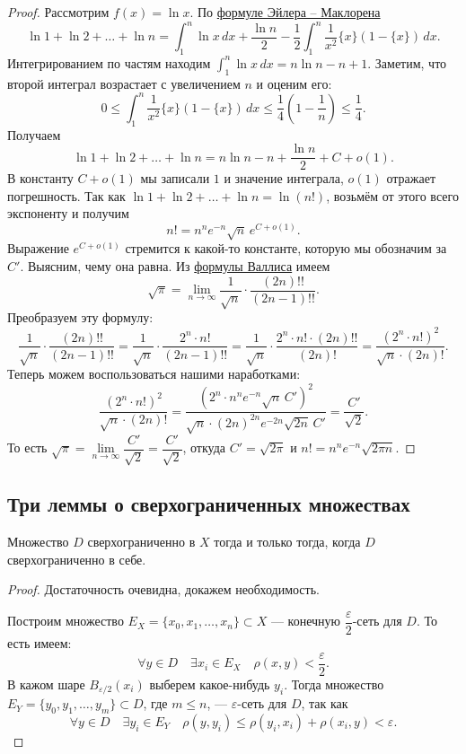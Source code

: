 \begin{proof}
	Рассмотрим \(f(x) = \ln x\). По \hyperlink{eumak}{формуле Эйлера -- Маклорена} \[
	\ln 1 + \ln 2 + \ldots + \ln n = \int_1^n \ln x \, dx + \frac{\ln n}{2} - \frac{1}{2} \int_1^n \frac{1}{x^2} \{x\} (1 - \{x\}) \, dx.
	\]
	Интегрированием по частям находим \(\displaystyle\int_1^n \ln x \, dx = n \ln n - n + 1\). Заметим, что второй интеграл возрастает с увеличением \(n\) и оценим его: \[
	0 \leqslant \int_1^n \frac{1}{x^2} \{x\} (1 - \{x\}) \, dx \leqslant \frac{1}{4} \left(1 - \frac{1}{n} \right) \leqslant \frac{1}{4}.
	\]
	Получаем \[
	\ln 1 + \ln 2 + \ldots + \ln n = n \ln n - n + \frac{\ln n}{2} + C + o(1).
	\]
	В константу \(C + o(1)\) мы записали \(1\) и значение интеграла, \(o(1)\) отражает погрешность. Так как \(\ln 1 + \ln 2 + \ldots + \ln n = \ln(n!)\), возьмём от этого всего экспоненту и получим \[
	n! = n^n e^{-n} \sqrt{n} \, e^{C + o(1)}.
	\]
	Выражение \(e^{C + o(1)}\) стремится к какой-то константе, которую мы обозначим за \(C'\). Выясним, чему она равна. Из \hyperlink{wall}{формулы Валлиса} имеем \[
	\sqrt{\pi} = \lim_{n \to \infty} \frac{1}{\sqrt{n}} \cdot \frac{(2n)!!}{(2n - 1)!!}.
	\]
	Преобразуем эту формулу: \[
	\frac{1}{\sqrt{n}} \cdot \frac{(2n)!!}{(2n - 1)!!} = \frac{1}{\sqrt{n}} \cdot \frac{2^n \cdot n!}{(2n - 1)!!} = \frac{1}{\sqrt{n}} \cdot \frac{2^n \cdot n! \cdot (2n)!!}{(2n)!} = \frac{(2^n \cdot n!)^2}{\sqrt{n} \cdot (2n)!}.
	\]
	Теперь можем воспользоваться нашими наработками: \[
	\frac{(2^n \cdot n!)^2}{\sqrt{n} \cdot (2n)!} = \frac{(2^n \cdot n^n e^{-n} \sqrt{n} \, C')^2}{\sqrt{n} \cdot (2n)^{2n} e^{-2n} \sqrt{2n} \, C'} = \frac{C'}{\sqrt{2}}.
	\]
	То есть \(\sqrt{\pi} = \lim\limits_{n \to \infty} \dfrac{C'}{\sqrt{2}} = \dfrac{C'}{\sqrt{2}}\), откуда \(C' = \sqrt{2\pi}\) и \(n! = n^n e^{-n} \sqrt{2\pi n}.\) 
	
\end{proof}

\subsection{Три леммы о сверхограниченных множествах}

\begin{lemma}
	Множество \(D\) сверхограниченно в \(X\) тогда и только тогда, когда \(D\) сверхограниченно в себе.
\end{lemma}

\begin{proof}
	Достаточность очевидна, докажем необходимость.
	
	Построим множество \(E_X = \{x_0, x_1,\ldots, x_n\} \subset X\) --- конечную \(\dfrac{\varepsilon}{2}\)-сеть для \(D\). То есть имеем: \[
	\forall y \in D \quad \exists x_i \in E_X \quad \rho(x, y) < \frac{\varepsilon}{2}.
	\]
	В кажом шаре \(B_{\varepsilon/2} (x_i)\) выберем какое-нибудь \(y_i\). Тогда множество \(E_Y = \{y_0, y_1,\ldots, y_m\} \subset D\), где \(m \leqslant n\), --- \(\varepsilon\)-сеть для \(D\), так как \[
	\forall y \in D \quad \exists y_i \in E_Y \quad \rho(y, y_i) \leqslant \rho(y_i, x_i) + \rho(x_i, y) < \varepsilon.
	\]
\end{proof}

